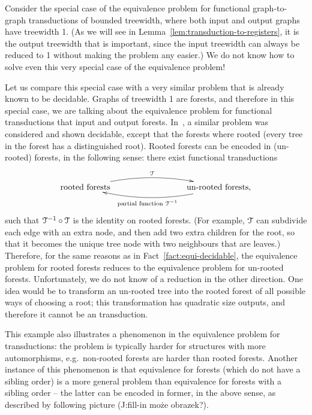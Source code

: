 \begin{example}
    Consider the special case of the equivalence problem for functional graph-to-graph \mso transductions of bounded treewidth, where both input and output graphs have treewidth 1. (As we will see in Lemma~\ref{lem:transduction-to-registers}, it is the output treewidth that is important, since the input treewidth can always be reduced to 1 without making the problem any easier.)   We do not know how to solve even this very special case of the equivalence problem! 
    
    Let us compare this special case with a very similar problem that is already known to be decidable. 
    Graphs of treewidth 1 are forests, and therefore in this special case, we are talking about the equivalence problem for functional \mso transductions that input and output forests.  In~\cite[Section 3]{boiretReducingTransducerEquivalence2018}, a similar problem was considered and shown decidable,  except that the forests where rooted (every tree in the forest has a distinguished root).  Rooted forests can be encoded in (un-rooted) forests, in the following sense: there exist functional \mso transductions
    \begin{align*}
        \xymatrix@C=3cm{
            \text{rooted forests}
            \ar@/^1pc/[r]^-{\Tt} &
            \text{un-rooted forests},
            \ar@/^1pc/[l]^-{\text{partial function }\Tt^{-1}}
        }
        \end{align*}
        such that ${\mathcal T}^{-1} \circ {\mathcal T}$ is the identity on rooted forests. (For example, ${\mathcal T}$  can subdivide each edge with an extra node, and then add two extra children for the root, so that it becomes the unique tree node with two neighbours that are leaves.) Therefore, for the same reasons as in Fact~\ref{fact:equi-decidable}, the equivalence problem for rooted forests reduces to the equivalence problem for un-rooted forests. Unfortunately, we do not know of a reduction in the other direction. One idea would be to transform an un-rooted tree into the rooted forest of all possible ways of choosing a root; this transformation has quadratic size outputs, and therefore it cannot be an \mso transduction.

        This example also illustrates a phenomenon in the equivalence problem for \mso transductions: the problem is typically harder for structures with more automorphisms, e.g.~non-rooted forests are harder than rooted forests. Another instance of this phenomenon is that equivalence for forests (which do not have a sibling order) is a more general problem than equivalence for forests with a sibling order -- the latter can be encoded in former, in the above sense, as described by following picture (J:fill-in może obrazek?).
    \end{example}   

